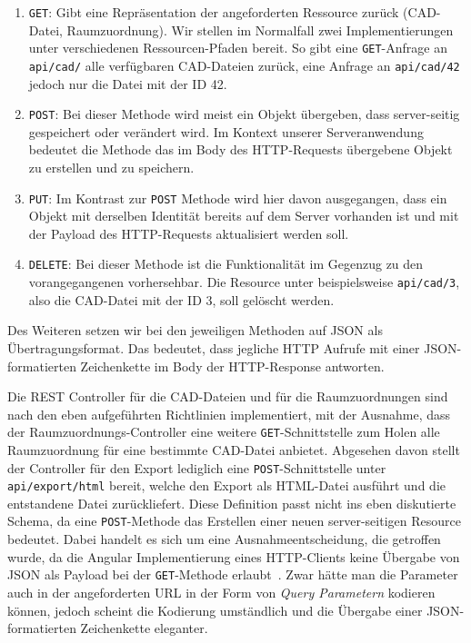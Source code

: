\begin{enumerate}
    \item \texttt{GET}: Gibt eine Repräsentation der angeforderten Ressource zurück (CAD-Datei, Raumzuordnung).
    Wir stellen im Normalfall zwei Implementierungen unter verschiedenen Ressourcen-Pfaden bereit.
    So gibt eine \texttt{GET}-Anfrage an \texttt{api/cad/} alle verfügbaren CAD-Dateien zurück, eine Anfrage an \texttt{api/cad/42} jedoch nur die Datei mit der ID 42.
    \item \texttt{POST}: Bei dieser Methode wird meist ein Objekt übergeben, dass server-seitig gespeichert oder verändert wird.
    Im Kontext unserer Serveranwendung bedeutet die Methode das im Body des HTTP-Requests übergebene Objekt zu erstellen und zu speichern.
    \item \texttt{PUT}: Im Kontrast zur \texttt{POST} Methode wird hier davon ausgegangen, dass ein Objekt mit derselben Identität bereits auf dem Server vorhanden ist und mit der Payload des HTTP-Requests aktualisiert werden soll.
    \item \texttt{DELETE}: Bei dieser Methode ist die Funktionalität im Gegenzug zu den vorangegangenen vorhersehbar.
    Die Resource unter beispielsweise \texttt{api/cad/3}, also die CAD-Datei mit der ID 3, soll gelöscht werden.
\end{enumerate}

Des Weiteren setzen wir bei den jeweiligen Methoden auf JSON als Übertragungsformat.
Das bedeutet, dass jegliche HTTP Aufrufe mit einer JSON-formatierten Zeichenkette im Body der HTTP-Response antworten.

Die REST Controller für die CAD-Dateien und für die Raumzuordnungen sind nach den eben aufgeführten Richtlinien implementiert, mit der Ausnahme, dass der Raumzuordnungs-Controller eine weitere \texttt{GET}-Schnittstelle zum Holen alle Raumzuordnung für eine bestimmte CAD-Datei anbietet.
Abgesehen davon stellt der Controller für den Export lediglich eine \texttt{POST}-Schnittstelle unter \texttt{api/export/html} bereit, welche den Export als HTML-Datei ausführt und die entstandene Datei zurückliefert.
Diese Definition passt nicht ins eben diskutierte Schema, da eine \texttt{POST}-Methode das Erstellen einer neuen server-seitigen Resource bedeutet.
Dabei handelt es sich um eine Ausnahmeentscheidung, die getroffen wurde, da die Angular Implementierung eines HTTP-Clients keine Übergabe von JSON als Payload bei der \texttt{GET}-Methode erlaubt~\cite{AngularHttpClientGet}.
Zwar hätte man die Parameter auch in der angeforderten URL in der Form von \textit{Query Parametern} kodieren können, jedoch scheint die Kodierung umständlich und die Übergabe einer JSON-formatierten Zeichenkette eleganter.

